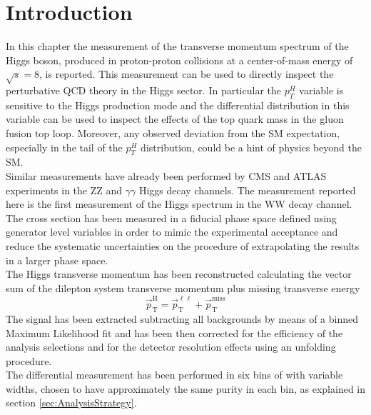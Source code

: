 \section{Introduction}
\label{sec:Introduction}

In this chapter the measurement of the transverse momentum spectrum of the Higgs boson, produced in proton-proton collisions at a center-of-mass energy of $\sqrt{s}=8$\TeV, is reported.
This measurement can be used to directly inspect the perturbative QCD theory in the Higgs sector.
In particular the $p_T^H$ variable is sensitive to the Higgs production mode and the differential distribution in this variable can be used to inspect the effects of the top quark mass in the gluon fusion top loop. Moreover, any observed deviation from the SM expectation, especially in the tail of the $p_T^H$ distribution, could be a hint of physics beyond the SM.\\
Similar measurements have already been performed by CMS and ATLAS experiments in the ZZ and $\gamma\gamma$ Higgs decay channels.
The measurement reported here is the first measurement of the Higgs \pt spectrum in the WW decay channel.\\
The cross section has been measured in a fiducial phase space defined using generator level variables in order to mimic the experimental acceptance and reduce the systematic uncertainties on the procedure of extrapolating the results in a larger phase space.\\
The Higgs transverse momentum has been reconstructed calculating the vector sum of the dilepton system transverse momentum plus missing transverse energy 
\begin{equation}
\vec{p}_\mathrm{T}^\mathrm{H} = \vec{p}_\mathrm{T}^{\ell\ell} + \vec{p}_\mathrm{T}^\mathrm{miss}
\end{equation}
The signal has been extracted subtracting all backgrounds by means of a binned Maximum Likelihood fit and has been then corrected for the efficiency of the analysis selections and for the detector resolution effects using an unfolding procedure.\\
The differential measurement has been performed in six bins of \pth with variable widths, chosen to have approximately the same purity in each bin, as explained in section \ref{sec:AnalysisStrategy}.\\



